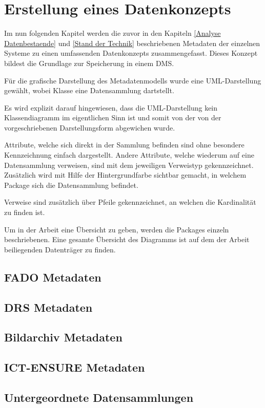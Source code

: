 \section{Erstellung eines Datenkonzepts} \label{Erstellung eines Datenkonzepts}
Im nun folgenden Kapitel werden die zuvor in den Kapiteln \ref{Analyse Datenbestaende} und \ref{Stand der Technik} beschriebenen Metadaten der einzelnen Systeme zu einen umfassenden Datenkonzepts zusammengefasst. Dieses Konzept bildest die Grundlage zur Speicherung in einem \ac{DMS}.

F\"ur die grafische Darstellung des Metadatenmodells wurde eine UML-Darstellung gew\"ahlt, wobei Klasse eine Datensammlung dartstellt. 

Es wird explizit darauf hingewiesen, dass die UML-Darstellung kein Klassendiagramm im eigentlichen Sinn ist und somit von der von der vorgeschriebenen Darstellungsform abgewichen wurde.

Attribute, welche sich direkt in der Sammlung befinden sind ohne besondere Kennzeichnung einfach dargestellt. Andere Attribute, welche wiederum auf eine Datensammlung verweisen, sind mit dem jeweiligen Verweistyp gekennzeichnet. Zus\"atzlich wird mit Hilfe der Hintergrundfarbe sichtbar gemacht, in welchem Package sich die Datensammlung befindet. 

Verweise sind zus\"atzlich \"uber Pfeile gekennzeichnet, an welchen die Kardinalit\"at zu finden ist.

Um in der Arbeit eine \"Ubersicht zu geben, werden die Packages einzeln beschriebenen. Eine gesamte \"Ubersicht des Diagramms ist auf dem der Arbeit beiliegenden Datentr\"ager zu finden.


\subsection{FADO Metadaten}
\subsection{DRS Metadaten}
\subsection{Bildarchiv Metadaten}
\subsection{ICT-ENSURE Metadaten}

\subsection{Untergeordnete Datensammlungen}
